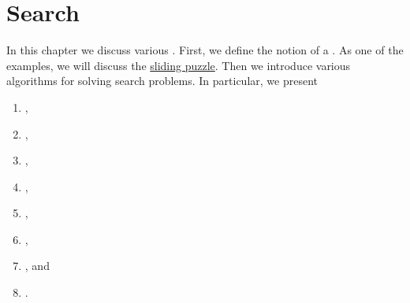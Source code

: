 \chapter{Search}
In this chapter we discuss various .  First, we define
the notion of a .  As one of the examples, we will discuss the
\href{https://en.wikipedia.org/wiki/15_puzzle}{sliding puzzle}.  Then we
introduce various algorithms for solving search problems.  In particular, we present
\begin{enumerate}
\item {},
\item {},
\item {},
\item {},
\item {},
\item {},
\item {}, and
\item {}.
\end{enumerate}

